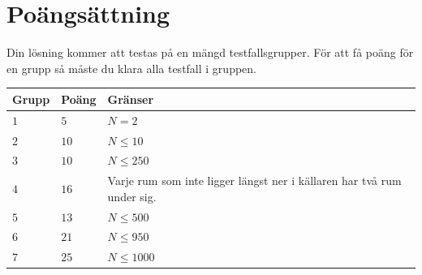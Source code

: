 \section*{Poängsättning}
Din lösning kommer att testas på en mängd testfallsgrupper.
För att få poäng för en grupp så måste du klara alla testfall i gruppen.

\noindent
\begin{tabular}{| l | l | p{12cm} |}
  \hline
  \textbf{Grupp} & \textbf{Poäng} & \textbf{Gränser} \\ \hline
  $1$   & $5$        & $N = 2$ \\ \hline
  $2$   & $10$        & $N \leq 10$ \\ \hline
  $3$   & $10$        & $N \leq 250$ \\ \hline
  $4$   & $16$        & Varje rum som inte ligger längst ner i källaren har två rum under sig. \\ \hline
  $5$   & $13$        & $N \leq 500$ \\ \hline
  $6$   & $21$        & $N \leq 950$ \\ \hline
  $7$   & $25$        & $N \leq 1000$ \\ \hline
\end{tabular}
